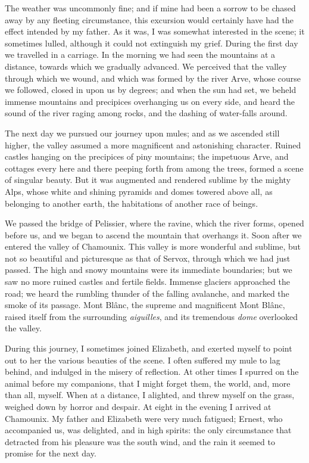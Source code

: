 The weather was uncommonly fine;
and if mine had been a sorrow to be
chased away by any fleeting circumstance,
this excursion would certainly
have had the effect intended by my father.
As it was, I was somewhat interested
in the scene; it sometimes lulled,
although it could not extinguish my
grief. During the first day we travelled
in a carriage. In the morning
we had seen the mountains at a distance,
towards which we gradually advanced.
We perceived that the valley
through which we wound, and which
was formed by the river Arve, whose
course we followed, closed in upon us
by degrees; and when the sun had set,
we beheld immense mountains and precipices
overhanging us on every side,
and heard the sound of the river raging
among rocks, and the dashing of water-falls
around.

The next day we pursued our journey
upon mules; and as we ascended
still higher, the valley assumed a more
magnificent and astonishing character.
Ruined castles hanging on the precipices
of piny mountains; the impetuous
Arve, and cottages every here and
there peeping forth from among the
trees, formed a scene of singular beauty.
But it was augmented and rendered
sublime by the mighty Alps, whose
white and shining pyramids and domes
towered above all, as belonging to another
earth, the habitations of another
race of beings.

We passed the bridge of Pelissier,
where the ravine, which the river forms,
opened before us, and we began to ascend
the mountain that overhangs it.
Soon after we entered the valley of
Chamounix. This valley is more wonderful
and sublime, but not so beautiful
and picturesque as that of Servox,
through which we had just passed.
The high and snowy mountains were
its immediate boundaries; but we saw
no more ruined castles and fertile fields.
Immense glaciers approached the road;
we heard the rumbling thunder of the
falling avalanche, and marked the
smoke of its passage. Mont Blânc,
the supreme and magnificent Mont
Blânc, raised itself from the surrounding
\emph{aiguilles}, and its tremendous \emph{dome}
overlooked the valley.

During this journey, I sometimes
joined Elizabeth, and exerted myself to
point out to her the various beauties of
the scene. I often suffered my mule to
lag behind, and indulged in the misery
of reflection. At other times I spurred
on the animal before my companions,
that I might forget them, the world,
and, more than all, myself. When at
a distance, I alighted, and threw myself
on the grass, weighed down by
horror and despair. At eight in the
evening I arrived at Chamounix. My
father and Elizabeth were very much
fatigued; Ernest, who accompanied
us, was delighted, and in high spirits:
the only circumstance that detracted
from his pleasure was the south wind,
and the rain it seemed to promise for
the next day.

